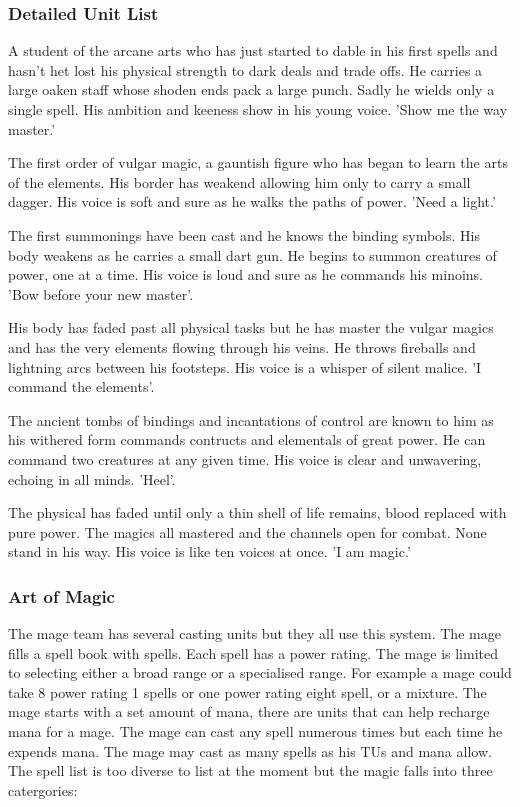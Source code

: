 \documentclass[a4paper,twocolumn]{article}
\begin{document}
\subsubsection{Detailed Unit List}

A student of the arcane arts who has just started to dable in his first spells and hasn't het lost his physical strength to dark deals and trade offs. He carries a large oaken staff whose shoden ends pack a large punch. Sadly he wields only a single spell. His ambition and keeness show in his young voice. 'Show me the way master.'

The first order of vulgar magic, a gauntish figure who has began to learn the arts of the elements. His border has weakend allowing him only to carry a small dagger. His voice is soft and sure as he walks the paths of power. 'Need a light.'

The first summonings have been cast and he knows the binding symbols. His body weakens as he carries a small dart gun. He begins to summon creatures of power, one at a time. His voice is loud and sure as he commands his minoins. 'Bow before your new master'.

His body has faded past all physical tasks but he has master the vulgar magics and has the very elements flowing through his veins. He throws fireballs and lightning arcs between his footsteps. His voice is a whisper of silent malice. 'I command the elements'.

The ancient tombs of bindings and incantations of control are known to him as his withered form commands contructs and elementals of great power. He can command two creatures at any given time. His voice is clear and unwavering, echoing in all minds. 'Heel'.

The physical has faded until only a thin shell of life remains, blood replaced with pure power. The magics all mastered and the channels open for combat. None stand in his way. His voice is like ten voices at once. 'I am magic.'

\subsubsection{Art of Magic}
The mage team has several casting units but they all use this system. The mage fills a spell book with spells. Each spell has a power rating. The mage is limited to selecting either a broad range or a specialised range. For example a mage could take 8 power rating 1 spells or one power rating eight spell, or a mixture.
The mage starts with a set amount of mana, there are units that can help recharge mana for a mage. The mage can cast any spell numerous times but each time he expends mana. The mage may cast as many spells as his TUs and mana allow.
The spell list is too diverse to list at the moment but the magic falls into three catergories:
\end{document}
